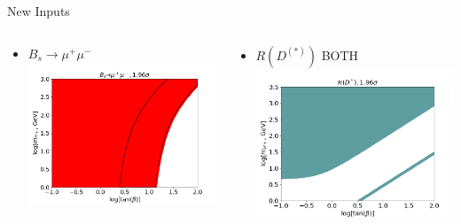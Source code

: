 \documentclass[10pt,xcolor={table,dvipsnames},t]{beamer}
\begin{document}
\begin{frame}{New Inputs}
    \begin{columns}[c]
        \begin{column}{0.45\textwidth}
            \begin{itemize}
                \item $B_s\to\mu^+\mu^-$ 
                    \includegraphics[scale=0.25]{mumu}
            \end{itemize}
        \end{column}
        \begin{column}{0.45\textwidth}
            \begin{itemize}
                \item $R(D^{(*)})$ BOTH 
                    \includegraphics[scale=0.25]{rd_196sig}
            \end{itemize}
        \end{column}
    \end{columns}
\end{frame}
\end{document}
